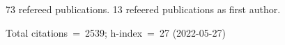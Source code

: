 73 refereed publications. 13 refeered publications as first author.

Total citations~=~2539; h-index~=~27 (2022-05-27)